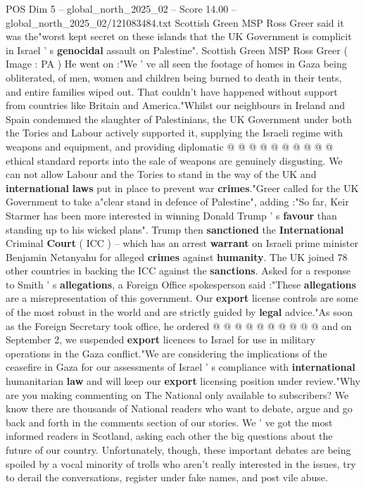 \begin{textsample}{POS Dim 5 – global\_north\_2025\_02 – Score 14.00 – global\_north\_2025\_02/121083484.txt}
Scottish Green MSP Ross Greer said it was the"worst kept secret on these islands that the UK Government is complicit in Israel ' s \textbf{genocidal} assault on Palestine".
Scottish Green MSP Ross Greer ( Image : PA ) He went on :"We ' ve all seen the footage of homes in Gaza being obliterated, of men, women and children being burned to death in their tents, and entire families wiped out.
That couldn't have happened without support from countries like Britain and America."Whilst our neighbours in Ireland and Spain condemned the slaughter of Palestinians, the UK Government under both the Tories and Labour actively supported it, supplying the Israeli regime with weapons and equipment, and providing diplomatic @ @ @ @ @ @ @ @ @ @ ethical standard reports into the sale of weapons are genuinely disgusting.
We can not allow Labour and the Tories to stand in the way of the UK and \textbf{international} \textbf{laws} put in place to prevent war \textbf{crimes}."Greer called for the UK Government to take a"clear stand in defence of Palestine", adding :"So far, Keir Starmer has been more interested in winning Donald Trump ' s \textbf{favour} than standing up to his wicked plans".
Trump then \textbf{sanctioned} the \textbf{International} Criminal \textbf{Court} ( ICC ) -- which has an arrest \textbf{warrant} on Israeli prime minister Benjamin Netanyahu for alleged \textbf{crimes} against \textbf{humanity}.
The UK joined 78 other countries in backing the ICC against the \textbf{sanctions}.
Asked for a response to Smith ' s \textbf{allegations}, a Foreign Office spokesperson said :"These \textbf{allegations} are a misrepresentation of this government.
Our \textbf{export} license controls are some of the most robust in the world and are strictly guided by \textbf{legal} advice."As soon as the Foreign Secretary took office, he ordered @ @ @ @ @ @ @ @ @ @ and on September 2, we suspended \textbf{export} licences to Israel for use in military operations in the Gaza conflict."We are considering the implications of the ceasefire in Gaza for our assessments of Israel ' s compliance with \textbf{international} humanitarian \textbf{law} and will keep our \textbf{export} licensing position under review."Why are you making commenting on The National only available to subscribers?
We know there are thousands of National readers who want to debate, argue and go back and forth in the comments section of our stories.
We ' ve got the most informed readers in Scotland, asking each other the big questions about the future of our country.
Unfortunately, though, these important debates are being spoiled by a vocal minority of trolls who aren't really interested in the issues, try to derail the conversations, register under fake names, and post vile abuse.

\end{textsample}
